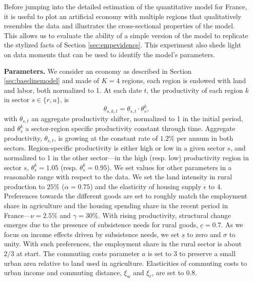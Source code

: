 \documentclass[11pt]{report}
\begin{document}
Before jumping into the detailed estimation of the quantitative model for France, it is useful to plot an artificial economy with multiple regions that qualitatively resembles the data and illustrates the cross-sectional properties of the model. This allows us to evaluate the ability of a simple version of the model to replicate the stylized facts of Section \ref{sec:empevidence}. This experiment also sheds light on data moments that can be used to identify the model's parameters.

\textbf{Parameters.} We consider an economy as described in Section \ref{sec:baselinemodel} and made of $K=4$ regions, each region is endowed with land and labor, both normalized to 1. At each date $t$, the productivity of each region $k$ in sector $s \in \{r,u\}$, is
\begin{equation*}
\theta_{s,k,t}=\theta_{s,t} \cdot \theta^{k}_{s},
\end{equation*}
with $\theta_{s,t}$ an aggregate productivity shifter, normalized to 1 in the initial period, and $\theta^{k}_{s}$ a sector-region specific productivity constant through time. Aggregate productivity, $\theta_{s,t}$, is growing at the constant rate of $1.2\%$ per annum in both sectors. Region-specific productivity is either high or low in a given sector $s$, and normalized to 1 in the other sector---in the high (resp. low) productivity region in sector $s$, $\theta^{k}_{s}=1.05$ (resp. $\theta^{k}_{s}=0.95$). We set values for other parameters in a reasonable range with respect to the data. We set the land intensity in rural production to $25\%$ ($\alpha=0.75$) and the elasticity of housing supply $\epsilon$ to 4. Preferences towards the different goods are set to roughly match the employment share in agriculture and the housing spending share in the recent period in France---$\nu=2.5\%$ and $\gamma=30\%$. With rising productivity, structural change emerges due to the presence of subsistence needs for rural goods, $\underline{c} = 0.7$. As we focus on income effects driven by subsistence needs, we set $\underline{s}$ to zero and $\sigma$ to unity. With such preferences, the employment share in the rural sector is about $2/3$ at start. The commuting costs parameter $a$ is set to $3$ to preserve a small urban area relative to land used in agriculture. Elasticities of commuting costs to urban income and commuting distance, $\xi_w$ and  $\xi_\ell$, are set to 0.8.
\end{document}
